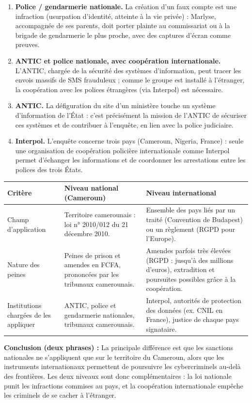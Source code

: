 \documentclass[11pt]{article}
\begin{document}
\begin{corrige}
\begin{enumerate}
\item \textbf{Police / gendarmerie nationale.} La création d'un faux compte est une infraction (usurpation d'identité, atteinte à la vie privée) : Marlyse, accompagnée de ses parents, doit porter plainte au commissariat ou à la brigade de gendarmerie le plus proche, avec des captures d'écran comme preuves.
\item \textbf{ANTIC et police nationale, avec coopération internationale.} L'ANTIC, chargée de la sécurité des systèmes d'information, peut tracer les envois massifs de SMS frauduleux ; comme le groupe est installé à l'étranger, la coopération avec les polices étrangères (via Interpol) est nécessaire.
\item \textbf{ANTIC.} La défiguration du site d'un ministère touche un système d'information de l'État : c'est précisément la mission de l'ANTIC de sécuriser ces systèmes et de contribuer à l'enquête, en lien avec la police judiciaire.
\item \textbf{Interpol.} L'enquête concerne trois pays (Cameroun, Nigeria, France) : seule une organisation de coopération policière internationale comme Interpol permet d'échanger les informations et de coordonner les arrestations entre les polices des trois États.
\end{enumerate}
\end{corrige}

\begin{corrige}
\begin{center}
\begin{tabularx}{\linewidth}{|l|X|X|}
\hline
\rowcolor{popblueL} \textbf{Critère} & \textbf{Niveau national (Cameroun)} & \textbf{Niveau international} \\
\hline
Champ d'application & Territoire camerounais : loi n° 2010/012 du 21 décembre 2010. & Ensemble des pays liés par un traité (Convention de Budapest) ou un règlement (RGPD pour l'Europe). \\
\hline
Nature des peines & Peines de prison et amendes en FCFA, prononcées par les tribunaux camerounais. & Amendes parfois très élevées (RGPD : jusqu'à des millions d'euros), extradition et poursuites possibles grâce à la coopération. \\
\hline
Institutions chargées de les appliquer & ANTIC, police et gendarmerie nationales, tribunaux camerounais. & Interpol, autorités de protection des données (ex. CNIL en France), justice de chaque pays signataire. \\
\hline
\end{tabularx}
\end{center}
\textbf{Conclusion (deux phrases) :} La principale différence est que les sanctions nationales ne s'appliquent que sur le territoire du Cameroun, alors que les instruments internationaux permettent de poursuivre les cybercriminels au-delà des frontières. Les deux niveaux sont donc complémentaires : la loi nationale punit les infractions commises au pays, et la coopération internationale empêche les criminels de se cacher à l'étranger.
\end{corrige}
\end{document}
